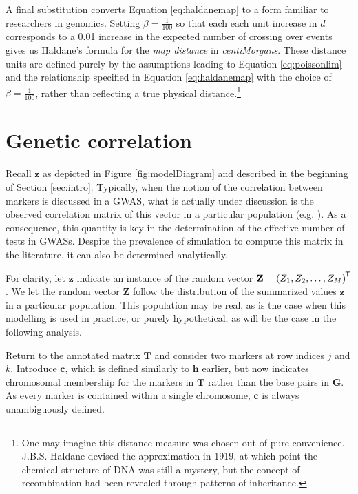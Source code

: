 \documentclass{article}
\newcommand{\ve}[1]{\mathbf{#1}}           %
\newcommand{\m}[1]{\mathbf{#1}}               %
\newcommand{\tr}[1]{{#1}^{\mkern-1.5mu\mathsf{T}}}              %
\begin{document}
\noindent A final substitution converts Equation \ref{eq:haldanemap} to a form familiar to researchers in genomics. Setting $\beta = \frac{1}{100}$ so that each each unit increase in $d$ corresponds to a 0.01 increase in the expected number of crossing over events gives us Haldane's formula for the \textit{map distance} in \textit{centiMorgans}. These distance units are defined purely by the assumptions leading to Equation \ref{eq:poissonlim} and the relationship specified in Equation \ref{eq:haldanemap} with the choice of $\beta = \frac{1}{100}$, rather than reflecting a true physical distance.\footnote{One may imagine this distance measure was chosen out of pure convenience. J.B.S. Haldane devised the approximation in 1919, at which point the chemical structure of DNA was still a mystery, but the concept of recombination had been revealed through patterns of inheritance.}

\section{Genetic correlation} \label{subsec:correlation}

Recall $\ve{z}$ as depicted in Figure \ref{fig:modelDiagram} and described in the beginning of Section \ref{sec:intro}. Typically, when the notion of the correlation between markers is discussed in a GWAS, what is actually under discussion is the observed correlation matrix of this vector in a particular population (e.g. \cite{cheverud2001}). As a consequence, this quantity is key in the determination of the effective number of tests in GWASs. Despite the prevalence of simulation to compute this matrix in the literature, it can also be determined analytically.

For clarity, let $\ve{z}$ indicate an instance of the random vector $\ve{Z} = \tr{(Z_1, Z_2, \dots, Z_M)}$. We let the random vector $\ve{Z}$ follow the distribution of the summarized values $\ve{z}$ in a particular population. This population may be real, as is the case when this modelling is used in practice, or purely hypothetical, as will be the case in the following analysis.

Return to the annotated matrix $\m{T}$ and consider two markers at row indices $j$ and $k$. Introduce $\ve{c}$, which is defined similarly to $\ve{h}$ earlier, but now indicates chromosomal membership for the markers in $\m{T}$ rather than the base pairs in $\m{G}$. As every marker is contained within a single chromosome, $\ve{c}$ is always unambiguously defined.
\end{document}
